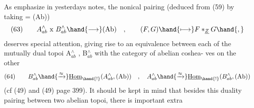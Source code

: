 As emphasize in yesterdays notes,  the nonical pairing (deduced
from (59)  by taking = (Ab))
\[ (63)\qquad A^{\wedge}_{ab} \text{ x } B^{\wedge}_{ab} \hand{\longrightarrow} (\text{Ab}) \quad , \qquad (F,G) \hand{\longmapsto} F *_{\underline{Z}} G \hand{,} \]
deserves special attention,  giving rise to an equivalence between each
of the mutually dual  topoi A$^{\wedge}_{ab}$ , B$^{\wedge}_{ab}$  with the category of abelian coshea-%
ves on the other
\[ (64)\qquad B^{\wedge}_{ab} \hand{\xrightarrow{\approx}} \underline{\text{Hom}}_{\hand{!}}(A^{\wedge}_{ab},(\text{Ab})) \quad , \quad A^{\wedge}_{ab} \hand{\xrightarrow{\approx}} \underline{\text{Hom}}_{\hand{!}}(B^{\wedge}_{ab},(\text{Ab})) \]
(cf (49) and (49)  page 399).  It should be kept in mind that besides
this duality pairing between two abelian topoi,  there is important extra

